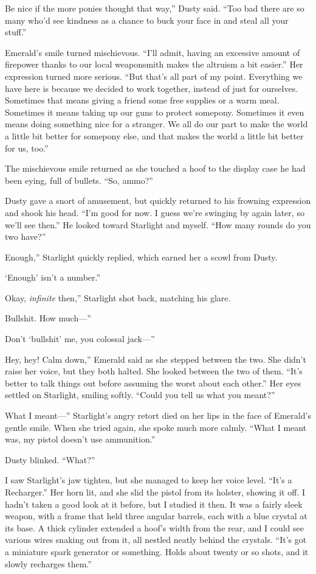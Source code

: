 \leavevmode{}Be nice if the more ponies thought that way,” Dusty said. “Too bad there are so many who’d see kindness as a chance to buck your face in and steal all your stuff.”

Emerald’s smile turned mischievous. “I’ll admit, having an excessive amount of firepower thanks to our local weaponsmith makes the altruism a bit easier.” Her expression turned more serious. “But that’s all part of my point. Everything we have here is because we decided to work together, instead of just for ourselves. Sometimes that means giving a friend some free supplies or a warm meal. Sometimes it means taking up our guns to protect somepony. Sometimes it even means doing something nice for a stranger. We all do our part to make the world a little bit better for somepony else, and that makes the world a little bit better for us, too.”

The mischievous smile returned as she touched a hoof to the display case he had been eying, full of bullets. “So, ammo?”

Dusty gave a snort of amusement, but quickly returned to his frowning expression and shook his head. “I’m good for now. I guess we’re swinging by again later, so we’ll see then.” He looked toward Starlight and myself. “How many rounds do you two have?”

\leavevmode{}Enough,” Starlight quickly replied, which earned her a scowl from Dusty.

\leavevmode{}‘Enough’ isn’t a number.”

\leavevmode{}Okay, \textit{infinite} then,” Starlight shot back, matching his glare.

\leavevmode{}Bullshit. How much—”

\leavevmode{}Don’t ‘bullshit’ me, you colossal jack—”

\leavevmode{}Hey, hey! Calm down,” Emerald said as she stepped between the two. She didn’t raise her voice, but they both halted. She looked between the two of them. “It’s better to talk things out before assuming the worst about each other.” Her eyes settled on Starlight, smiling softly. “Could you tell us what you meant?”

\leavevmode{}What I meant—” Starlight’s angry retort died on her lips in the face of Emerald’s gentle smile. When she tried again, she spoke much more calmly. “What I meant was, my pistol doesn’t use ammunition.”

Dusty blinked. “What?”

I saw Starlight’s jaw tighten, but she managed to keep her voice level. “It’s a Recharger.” Her horn lit, and she slid the pistol from its holster, showing it off. I hadn’t taken a good look at it before, but I studied it then. It was a fairly sleek weapon, with a frame that held three angular barrels, each with a blue crystal at its base. A thick cylinder extended a hoof’s width from the rear, and I could see various wires snaking out from it, all nestled neatly behind the crystals. “It’s got a miniature spark generator or something. Holds about twenty or so shots, and it slowly recharges them.”

